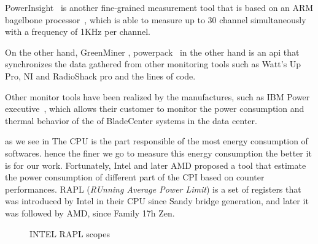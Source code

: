 PowerInsight~\cite{laros2013powerinsight} is another fine-grained measurement tool that is based on an ARM bagelbone processor~\cite{coley2012beaglebone}, which is able to measure up to 30 channel simultaneously with a frequency of 1KHz per channel.

On the other hand, GreenMiner \cite{hindle2014greenminer}, %
powerpack~\cite{ge2009powerpack} in the other hand is an api that synchronizes the data gathered from other monitoring tools such as Watt’s Up Pro, NI and RadioShack pro and the lines of code. %

Other monitor tools have been realized by the manufactures, such as IBM Power executive~\cite{koomey2011growth}, which allows their customer to monitor the power consumption and thermal behavior of the of BladeCenter systems in the data center.




as we see in %
The CPU is the part responsible of the most energy consumption of softwares. hence the finer we go to measure this energy consumption the better it is for our work.
Fortunately, Intel and later AMD proposed a tool that estimate the power consumption of different part of the CPI based on counter performances.
RAPL (\emph{RUnning Average Power Limit}) \cite{hackenberg2013power,hackenberg2015energy} is a set of registers that was introduced by Intel in their CPU since Sandy bridge generation, and later it was followed by AMD, since Family 17h Zen.


\begin{figure}[!hbt]
    \caption{INTEL RAPL scopes
    }\label{fig:rapl-domaine}
\end{figure}

